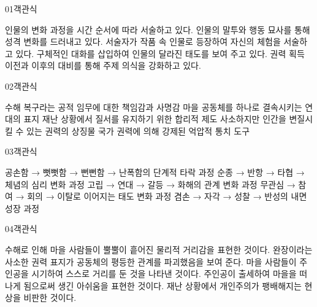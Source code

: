 \documentclass[fs85,seriesWit]{korfarm-base}
\begin{document}

\kfBeginMC
\begin{kfQBlock}{01}{객관식}
\begin{kfChoices}
\kfChoice 인물의 변화 과정을 시간 순서에 따라 서술하고 있다.
\kfChoice 인물의 말투와 행동 묘사를 통해 성격 변화를 드러내고 있다.
\kfChoice 서술자가 작품 속 인물로 등장하여 자신의 체험을 서술하고 있다.
\kfChoice 구체적인 대화를 삽입하여 인물의 달라진 태도를 보여 주고 있다.
\kfChoice 권력 획득 이전과 이후의 대비를 통해 주제 의식을 강화하고 있다.
\end{kfChoices}
\end{kfQBlock}

\begin{kfQBlock}{02}{객관식}
\begin{kfChoices}
\kfChoice 수해 복구라는 공적 임무에 대한 책임감과 사명감
\kfChoice 마을 공동체를 하나로 결속시키는 연대의 표지
\kfChoice 재난 상황에서 질서를 유지하기 위한 합리적 제도
\kfChoice 사소하지만 인간을 변질시킬 수 있는 권력의 상징물
\kfChoice 국가 권력에 의해 강제된 억압적 통치 도구
\end{kfChoices}
\end{kfQBlock}

\begin{kfQBlock}{03}{객관식}
\begin{kfChoices}
\kfChoice 공손함 → 뻣뻣함 → 뻔뻔함 → 난폭함의 단계적 타락 과정
\kfChoice 순종 → 반항 → 타협 → 체념의 심리 변화 과정
\kfChoice 고립 → 연대 → 갈등 → 화해의 관계 변화 과정
\kfChoice 무관심 → 참여 → 회의 → 이탈로 이어지는 태도 변화 과정
\kfChoice 겸손 → 자각 → 성찰 → 반성의 내면 성장 과정
\end{kfChoices}
\end{kfQBlock}

\begin{kfQBlock}{04}{객관식}
\begin{kfChoices}
\kfChoice 수해로 인해 마을 사람들이 뿔뿔이 흩어진 물리적 거리감을 표현한 것이다.
\kfChoice 완장이라는 사소한 권력 표지가 공동체의 평등한 관계를 파괴했음을 보여 준다.
\kfChoice 마을 사람들이 주인공을 시기하여 스스로 거리를 둔 것을 나타낸 것이다.
\kfChoice 주인공이 출세하여 마을을 떠나게 됨으로써 생긴 아쉬움을 표현한 것이다.
\kfChoice 재난 상황에서 개인주의가 팽배해지는 현상을 비판한 것이다.
\end{kfChoices}
\end{kfQBlock}
\end{document}
